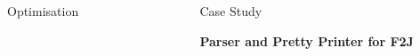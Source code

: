 \documentclass[final]{beamer}
\newlength{\sepwid}
\newlength{\onecolwid}
\newlength{\twocolwid}
\begin{document}
\begin{frame}[t]
\begin{columns}[t]
\begin{column}{\twocolwid}
\begin{columns}[t,totalwidth=\twocolwid]
\begin{column}{\onecolwid}
\begin{block}{Optimisation}

\end{block}


\end{column} %

\end{columns} %

\end{column} %

\begin{column}{\sepwid}\end{column} %

\begin{column}{\onecolwid} %


\begin{block}{Case Study}

\textbf{Parser and Pretty Printer for F2J}


\end{block}
\end{column}
\end{columns}
\end{frame}
\end{document}
